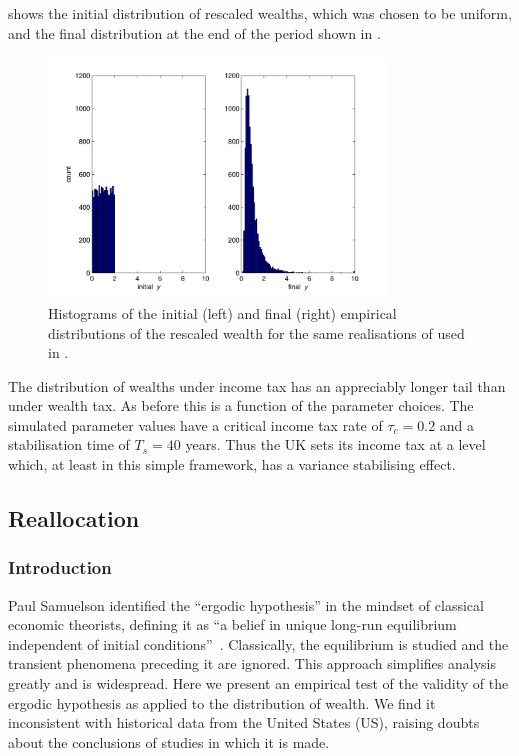  shows the initial distribution of rescaled wealths, which was chosen to be uniform, and the final distribution at the end of the period shown in .
\begin{figure}
\bc
\includegraphics[width=0.8\textwidth]{./chapter_3/figs/hist_income.pdf}
\caption{Histograms of the initial (left) and final (right) empirical distributions of the rescaled wealth for the same realisations of  used in .}
\ec
\end{figure}
The distribution of wealths under income tax has an appreciably longer tail than under wealth tax. As before this is a function of the parameter choices. The simulated parameter values have a critical income tax rate of $\tau_c=0.2$ and a stabilisation time of $T_s=40$ years. Thus the UK sets its income tax at a level which, at least in this simple framework, has a variance stabilising effect.

\subsection{Reallocation}\label{reallocation}
\subsubsection{Introduction}\label{sec:introduction}
Paul Samuelson identified the ``ergodic hypothesis'' in the mindset of classical economic theorists, defining it as ``a belief in unique long-run equilibrium independent of initial conditions''~\cite[pp.~11-12]{Samuelson1968}. Classically, the equilibrium is studied and the transient phenomena preceding it are ignored. This approach simplifies analysis greatly and is widespread. Here we present an empirical test of the validity of the ergodic hypothesis as applied to the distribution of wealth. We find it inconsistent with historical data from the United States (US), raising doubts about the conclusions of studies in which it is made.


